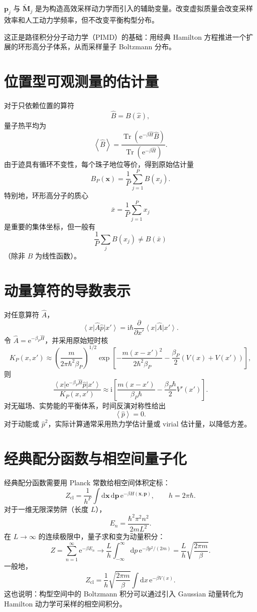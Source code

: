 \documentclass[11pt,a4paper,oneside,openany,fontset=fandol]{ctexbook}
\newcommand{\dd}{\mathrm{d}}
\newcommand{\ee}{\mathrm{e}}
\newcommand{\ii}{\mathrm{i}}
\newcommand{\Tr}{\operatorname{Tr}}
\newcommand{\ket}[1]{\left|#1\right\rangle}
\newcommand{\bra}[1]{\left\langle#1\right|}
\newcommand{\avg}[1]{\left\langle #1\right\rangle}
\newcommand{\vct}[1]{\bm{#1}}
\newcommand{\mat}[1]{\mathbf{#1}}
\begin{document}
\begin{remarkbox}[虚拟动量不是物理动量]
$\vct p_j$ 与 $\widetilde{\mat M}_j$ 是为构造高效采样动力学而引入的辅助变量。改变虚拟质量会改变采样效率和人工动力学频率，但不改变平衡构型分布。
\end{remarkbox}

这正是路径积分分子动力学（PIMD）的基础：用经典 Hamilton 方程推进一个扩展的环形高分子体系，从而采样量子 Boltzmann 分布。

\section{位置型可观测量的估计量}

对于只依赖位置的算符
\[
\hat B=B(\hat x),
\]
量子热平均为
\[
\avg{\hat B}
=
\frac{\Tr(\ee^{-\beta\hat H}\hat B)}
{\Tr(\ee^{-\beta\hat H})}.
\]
由于迹具有循环不变性，每个珠子地位等价，得到原始估计量
\[
\boxed{
B_P(\vct x)
=
\frac1P\sum_{j=1}^{P}B(x_j)
}.
\]
特别地，环形高分子的质心
\[
\bar x=\frac1P\sum_{j=1}^{P}x_j
\]
是重要的集体坐标，但一般有
\[
\frac1P\sum_jB(x_j)\ne B(\bar x)
\]
（除非 $B$ 为线性函数）。

\section{动量算符的导数表示}

对任意算符 $\hat A$，
\[
\bra{x}\hat A\hat p\ket{x'}
=
\ii\hbar\frac{\partial}{\partial x'}
\bra{x}\hat A\ket{x'}.
\]
令 $\hat A=\ee^{-\beta_P\hat H}$，并采用原始短时核
\[
K_P(x,x')
\approx
\left(
\frac{m}{2\pi\hbar^2\beta_P}
\right)^{1/2}
\exp\left[
-\frac{m(x-x')^2}{2\hbar^2\beta_P}
-\frac{\beta_P}{2}\left(V(x)+V(x')\right)
\right],
\]
则
\[
\frac{\bra{x}\ee^{-\beta_P\hat H}\hat p\ket{x'}}
{K_P(x,x')}
\approx
\ii\left[
\frac{m(x-x')}{\beta_P\hbar}
-\frac{\beta_P\hbar}{2}V'(x')
\right].
\]
对无磁场、实势能的平衡体系，时间反演对称性给出
\[
\avg{\hat p}=0.
\]
对于动能或 $\hat p^2$，实际计算通常采用热力学估计量或 virial 估计量，以降低方差。

\section{经典配分函数与相空间量子化}
\label{sec:classicalZ}

经典配分函数需要用 Planck 常数给相空间体积定标：
\[
Z_{\mathrm{cl}}
=
\frac{1}{h^F}
\int\dd\vct x\,\dd\vct p\,
\ee^{-\beta H(\vct x,\vct p)},
\qquad h=2\pi\hbar.
\]
对于一维无限深势阱（长度 $L$），
\[
E_n=\frac{\hbar^2\pi^2n^2}{2mL^2}.
\]
在 $L\to\infty$ 的连续极限中，量子求和变为动量积分：
\[
Z
=
\sum_{n=1}^{\infty}\ee^{-\beta E_n}
\longrightarrow
\frac{L}{h}
\int_{-\infty}^{\infty}
\dd p\,\ee^{-\beta p^2/(2m)}
=
\frac{L}{h}
\sqrt{\frac{2\pi m}{\beta}}.
\]
一般地，
\[
Z_{\mathrm{cl}}
=
\frac1h
\sqrt{\frac{2\pi m}{\beta}}
\int\dd x\,\ee^{-\beta V(x)}.
\]
这也说明：构型空间中的 Boltzmann 积分可以通过引入 Gaussian 动量转化为 Hamilton 动力学可采样的相空间积分。
\end{document}
